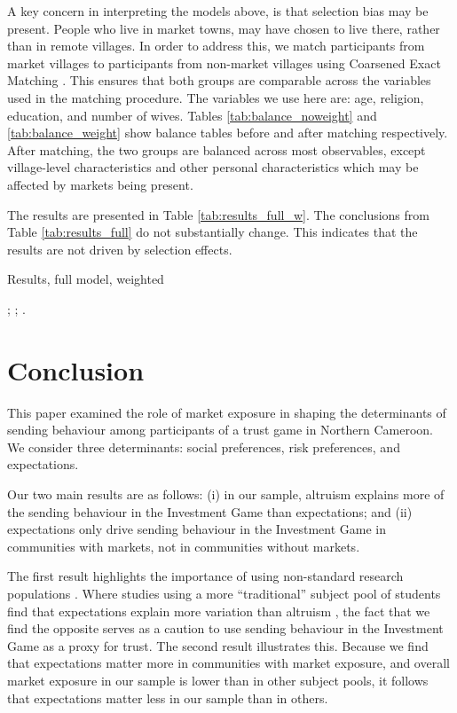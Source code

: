 A key concern in interpreting the models above, is that selection bias may be present. People who live in market towns, may have chosen to live there, rather than in remote villages. In order to address this, we match participants from market villages to participants from non-market villages using Coarsened Exact Matching \citep{Blackwell2010}. This ensures that both groups are comparable across the variables used in the matching procedure. The variables we use here are: age, religion, education, and number of wives. Tables \ref{tab:balance_noweight} and \ref{tab:balance_weight} show balance tables before and after matching respectively. After matching, the two groups are balanced across most observables, except village-level characteristics and other personal characteristics which may be affected by markets being present.

The results are presented in Table \ref{tab:results_full_w}. The conclusions from Table \ref{tab:results_full} do not substantially change. This indicates that the results are not driven by selection effects.

\begin{threeparttable}[htb]
	\small
	\caption{Results, full model, weighted}
	\label{tab:results_full_w}
	\centering
	
	\begin{tablenotes}
		\footnotesize
		\item \camsig; \camcluster; \camcontrols.
		\item
	\end{tablenotes}
\end{threeparttable}

\section{Conclusion}
This paper examined the role of market exposure in shaping the determinants of sending behaviour among participants of a trust game in Northern Cameroon. We consider three determinants: social preferences, risk preferences, and expectations. 

Our two main results are as follows: (i) in our sample, altruism explains more of the sending behaviour in the Investment Game than expectations; and (ii) expectations only drive sending behaviour in the Investment Game in communities with markets, not in communities without markets.  

The first result highlights the importance of using non-standard research populations \citep{Henrich2010a}. Where studies using a more ``traditional'' subject pool of students find that expectations explain more variation than altruism \citep[see e.g.][]{Ashraf2006}, the fact that we find the opposite serves as a caution to use sending behaviour in the Investment Game as a proxy for trust. The second result illustrates this. Because we find that expectations matter more in communities with market exposure, and overall market exposure in our sample is lower than in other subject pools, it follows that expectations matter less in our sample than in others.


